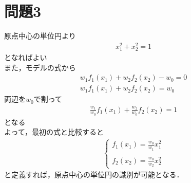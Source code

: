 \section*{問題3}
\noindent
原点中心の単位円より
\begin{eqnarray*}
    x_1^2+x_2^2=1
\end{eqnarray*}
となればよい\\
また，モデルの式から
\begin{eqnarray*}
    w_1f_1(x_1)+w_2f_2(x_2)-w_0=0\\
    w_1f_1(x_1)+w_2f_2(x_2)=w_0
\end{eqnarray*}
両辺を$w_0$で割って
\begin{eqnarray*}
    \frac{w_1}{w_0}f_1(x_1)+\frac{w_2}{w_0}f_2(x_2)=1
\end{eqnarray*}
となる\\
よって，最初の式と比較すると
\begin{eqnarray*}
    \left\{\begin{array}{c}f_1(x_1)=\frac{w_0}{w_1}x_1^2\\\\f_2(x_2)=\frac{w_0}{w_2}x_2^2\end{array}\right.
\end{eqnarray*}
と定義すれば，原点中心の単位円の識別が可能となる．
